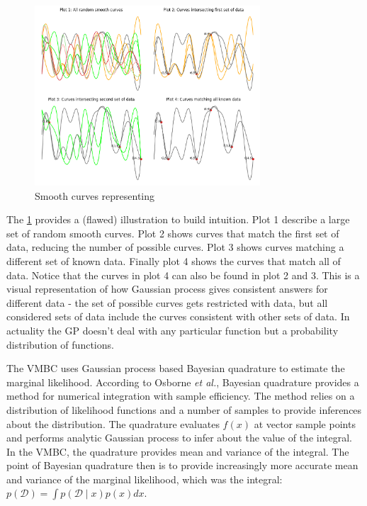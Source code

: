 \documentclass[english,oneside,openany]{UH_DS_report}
\begin{document}
\begin{figure}[h]
    \centering
    \includegraphics[width=0.75\textwidth]{plots.png}
    \caption{Smooth curves representing}
    \label{Fig:gp-curves}
\end{figure}

The \cref{Fig:gp-curves} provides a (flawed) illustration to build intuition. Plot 1 describe a large set of random smooth curves. Plot 2 shows
curves that match the first set of data, reducing the number of possible curves. Plot 3 shows curves matching
a different set of known data. Finally plot 4 shows the curves that match all of data. Notice that 
the curves in plot 4 can also be found in plot 2 and 3. This is a visual representation of how Gaussian process
gives consistent answers for different data - the set of possible curves gets restricted with data, but all
considered sets of data include the curves consistent with other sets of data. In actuality the GP doesn't 
deal with any particular function but a probability distribution of functions.

The VMBC uses Gaussian process based Bayesian quadrature to estimate the marginal likelihood\cite{acerbi2018}. 
According to Osborne \textit{et al.}, Bayesian quadrature provides a method for numerical integration with sample
efficiency. The method relies on a distribution of likelihood functions and a number of samples to provide
inferences about the distribution\cite{bayesian_quadrature}. The quadrature evaluates $f(x)$ at vector sample
points and performs analytic Gaussian process to infer about the value of the integral. In the VMBC, the 
quadrature provides mean and variance of the integral\cite{acerbi2018}.
The point of Bayesian quadrature then is to provide increasingly more accurate mean and variance of the
marginal likelihood, which was the integral: $p(\mathcal{D})=\int p(\mathcal{D}\mid x)p(x)dx$.
\end{document}
